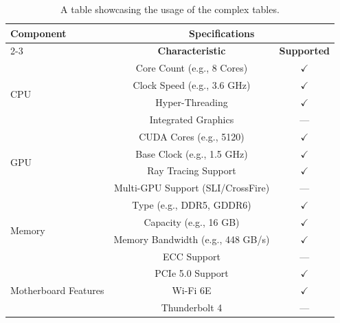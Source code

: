 \begin{table}[!htpb]
    \caption{A table showcasing the usage of the complex tables.}
    \label{tab:table-04}
    \centering
    \begin{tabular}{lcc}
        \toprule
        \multirow{2}{*}{\textbf{Component}}   & \multicolumn{2}{c}{\textbf{Specifications}}                      \\
        \cmidrule(lr){2-3}
                                              & \textbf{Characteristic}                     & \textbf{Supported} \\
        \midrule
        \multirow{4}{*}{CPU}                  & Core Count (e.g., 8 Cores)                  & \(\checkmark\)     \\
                                              & Clock Speed (e.g., 3.6 GHz)                 & \(\checkmark\)     \\
                                              & Hyper-Threading                             & \(\checkmark\)     \\
                                              & Integrated Graphics                         & ---                \\
        \midrule
        \multirow{4}{*}{GPU}                  & CUDA Cores (e.g., 5120)                     & \(\checkmark\)     \\
                                              & Base Clock (e.g., 1.5 GHz)                  & \(\checkmark\)     \\
                                              & Ray Tracing Support                         & \(\checkmark\)     \\
                                              & Multi-GPU Support (SLI/CrossFire)           & ---                \\
        \midrule
        \multirow{4}{*}{Memory}               & Type (e.g., DDR5, GDDR6)                    & \(\checkmark\)     \\
                                              & Capacity (e.g., 16 GB)                      & \(\checkmark\)     \\
                                              & Memory Bandwidth (e.g., 448 GB/s)           & \(\checkmark\)     \\
                                              & ECC Support                                 & ---                \\
        \midrule
        \multirow{3}{*}{Motherboard Features} & PCIe 5.0 Support                            & \(\checkmark\)     \\
                                              & Wi-Fi 6E                                    & \(\checkmark\)     \\
                                              & Thunderbolt 4                               & ---                \\
        \bottomrule
    \end{tabular}
\end{table}

